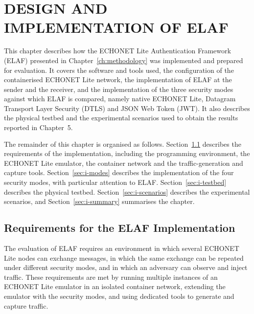 \providecommand{\tbd}{\textbf{[TBD]}}

\chapter{DESIGN AND IMPLEMENTATION OF ELAF}
\label{ch:implementation}

This chapter describes how the ECHONET Lite Authentication Framework (ELAF) presented in Chapter~\ref{ch:methodology} was implemented and prepared for evaluation. It covers the software and tools used, the configuration of the containerised ECHONET Lite network, the implementation of ELAF at the sender and the receiver, and the implementation of the three security modes against which ELAF is compared, namely native ECHONET Lite, Datagram Transport Layer Security (DTLS) and JSON Web Token (JWT). It also describes the physical testbed and the experimental scenarios used to obtain the results reported in Chapter~5.

The remainder of this chapter is organised as follows. Section~\ref{sec:i-req} describes the requirements of the implementation, including the programming environment, the ECHONET Lite emulator, the container network and the traffic-generation and capture tools. Section~\ref{sec:i-modes} describes the implementation of the four security modes, with particular attention to ELAF. Section~\ref{sec:i-testbed} describes the physical testbed. Section~\ref{sec:i-scenarios} describes the experimental scenarios, and Section~\ref{sec:i-summary} summarises the chapter.

\section{Requirements for the ELAF Implementation}
\label{sec:i-req}

The evaluation of ELAF requires an environment in which several ECHONET Lite nodes can exchange messages, in which the same exchange can be repeated under different security modes, and in which an adversary can observe and inject traffic. These requirements are met by running multiple instances of an ECHONET Lite emulator in an isolated container network, extending the emulator with the security modes, and using dedicated tools to generate and capture traffic.

